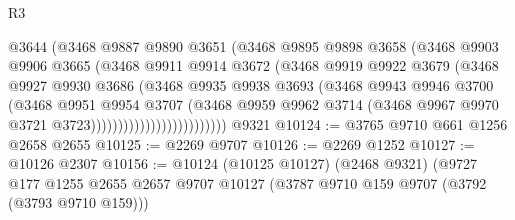 \begin{lexlean}{R3}
\begin{coremodule}
                                @3644
                                (@3468
                                  @9887
                                  @9890
                                  @3651
                                  (@3468
                                    @9895
                                    @9898
                                    @3658
                                    (@3468
                                      @9903
                                      @9906
                                      @3665
                                      (@3468
                                        @9911
                                        @9914
                                        @3672
                                        (@3468
                                          @9919
                                          @9922
                                          @3679
                                          (@3468
                                            @9927
                                            @9930
                                            @3686
                                            (@3468
                                              @9935
                                              @9938
                                              @3693
                                              (@3468
                                                @9943
                                                @9946
                                                @3700
                                                (@3468
                                                  @9951
                                                  @9954
                                                  @3707
                                                  (@3468
                                                    @9959
                                                    @9962
                                                    @3714
                                                    (@3468
                                                      @9967
                                                      @9970
                                                      @3721
                                                      @3723)))))))))))))))))))))))))
    @9321
@10124 := @3765 @9710 @661 @1256 @2658 @2655
@10125 := @2269 @9707
@10126 := @2269 @1252
@10127 := @10126 @2307
@10156 := @10124
    (@10125 @10127)
    (@2468 @9321)
    (@9727
      @177
      @1255
      @2655
      @2657
      @9707
      @10127
      (@3787 @9710 @159 @9707 (@3792 (@3793 @9710 @159)))

\end{coremodule}
\end{lexlean}
